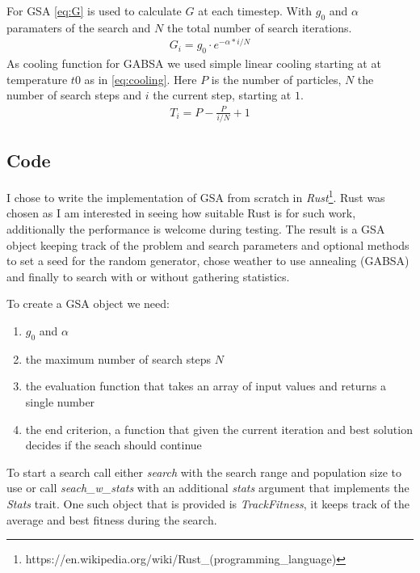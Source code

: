 For GSA \cref{eq:G} is used to calculate $G$ at each timestep. With $g_0$ and $\alpha$ paramaters of the search and $N$ the total number of search iterations.
%
\begin{align} \label{eq:G}
	G_i = g_0 \cdot e^{- \alpha * i/N}
\end{align}
%
As cooling function for GABSA we used simple linear cooling starting at at temperature $t0$ as in \cref{eq:cooling}. Here $P$ is the number of particles, $N$ the number of search steps and $i$ the current step, starting at $1$.
%
\begin{align} \label{eq:cooling}
	T_i = P - \frac{P}{i/N} + 1
\end{align}
%
\subsection{Code}
I chose to write the implementation of GSA from scratch in \textit{Rust}\footnote{https://en.wikipedia.org/wiki/Rust\_(programming\_language)}. Rust was chosen as I am interested in seeing how suitable Rust is for such work, additionally the performance is welcome during testing. The result is a GSA object keeping track of the problem and search parameters and optional methods to set a seed for the random generator, chose weather to use annealing (GABSA) and finally to search with or without gathering statistics.

To create a GSA object we need:
%
\begin{enumerate}
\item $g_0$ and $\alpha$
\item the maximum number of search steps $N$
\item the evaluation function that takes an array of input values and returns a single number
\item the end criterion, a function that given the current iteration and best solution decides if the seach should continue
\end{enumerate}
%
To start a search call either \textit{search} with the search range and population size to use or call \textit{seach\_w\_stats} with an additional \textit{stats} argument that implements the \textit{Stats} trait. One such object that is provided is \textit{TrackFitness}, it keeps track of the average and best fitness during the search.
